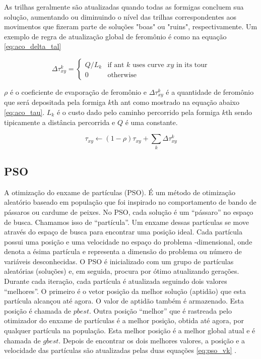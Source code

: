 As trilhas geralmente são atualizadas quando todas as formigas concluem sua solução, aumentando ou diminuindo o nível das trilhas correspondentes aos movimentos que fizeram parte de soluções "boas" ou "ruins", respectivamente. Um exemplo de regra de atualização global de feromônio é como na equação \ref{eq:aco_delta_tal}

\begin{equation}
\label{eq:aco_delta_tal}
    \Delta{\tau^{k}_{xy}} =
    \begin{cases}
    Q/L_k & \mbox{if ant }k\mbox{ uses curve }xy\mbox{ in its tour} \\
    0 & \mbox{otherwise}
    \end{cases}
\end{equation}

$\rho$ é o coeficiente de evaporação de feromônio e $\Delta \tau _{xy}^{k}$ é a quantidade de feromônio que será depositada pela formiga $k$th ant como mostrado na equação abaixo \ref{eq:aco_tau}. $L_{k}$ é o custo dado pelo caminho percorrido pela formiga $k$th sendo tipicamente a distância percorrida e $Q$ é uma constante.

\begin{equation}
\label{eq:aco_tau}
    \tau_{xy} \leftarrow
    (1-\rho)\tau_{xy} + \sum_{k}\Delta \tau^{k}_{xy}
\end{equation}

\subsection{PSO}

A otimização do enxame de partículas (PSO). É um método de otimização aleatório baseado em população que foi inspirado no comportamento de bando de pássaros ou cardume de peixes. No PSO, cada solução é um “pássaro” no espaço de busca. Chamamos isso de “partícula”. Um enxame dessas partículas se move através do espaço de busca para encontrar uma posição ideal. Cada partícula possui uma posição e uma velocidade no espaço do problema -dimensional, onde denota a ésima partícula e representa a dimensão do problema ou número de variáveis desconhecidas. O PSO é inicializado com um grupo de partículas aleatórias (soluções) e, em seguida, procura por ótimo atualizando gerações. Durante cada iteração, cada partícula é atualizada seguindo dois valores “melhores”. O primeiro é o vetor posição da melhor solução (aptidão) que esta partícula alcançou até agora. O valor de aptidão também é armazenado. Esta posição é chamada de $pbest$. Outra posição “melhor” que é rastreada pelo otimizador do enxame de partículas é a melhor posição, obtida até agora, por qualquer partícula na população. Esta melhor posição é a melhor global atual e é chamada de $gbest$. Depois de encontrar os dois melhores valores, a posição e a velocidade das partículas são atualizadas pelas duas equações \ref{eq:pso_vk} \cite{jaberipour2011particle}.


